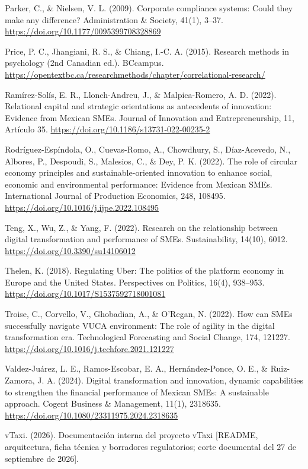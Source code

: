 {Parker, C., \& Nielsen, V. L. (2009). Corporate compliance systems: Could they make any difference? Administration \& Society, 41(1), 3–37. \url{https://doi.org/10.1177/0095399708328869}


Price, P. C., Jhangiani, R. S., \& Chiang, I.-C. A. (2015). Research methods in psychology (2nd Canadian ed.). BCcampus. \url{https://opentextbc.ca/researchmethods/chapter/correlational-research/}


Ramírez-Solís, E. R., Llonch-Andreu, J., \& Malpica-Romero, A. D. (2022). Relational capital and strategic orientations as antecedents of innovation: Evidence from Mexican SMEs. Journal of Innovation and Entrepreneurship, 11, Artículo 35. \url{https://doi.org/10.1186/s13731-022-00235-2}


Rodríguez-Espíndola, O., Cuevas-Romo, A., Chowdhury, S., Díaz-Acevedo, N., Albores, P., Despoudi, S., Malesios, C., \& Dey, P. K. (2022). The role of circular economy principles and sustainable-oriented innovation to enhance social, economic and environmental performance: Evidence from Mexican SMEs. International Journal of Production Economics, 248, 108495. \url{https://doi.org/10.1016/j.ijpe.2022.108495}


Teng, X., Wu, Z., \& Yang, F. (2022). Research on the relationship between digital transformation and performance of SMEs. Sustainability, 14(10), 6012. \url{https://doi.org/10.3390/su14106012}


Thelen, K. (2018). Regulating Uber: The politics of the platform economy in Europe and the United States. Perspectives on Politics, 16(4), 938–953. \url{https://doi.org/10.1017/S1537592718001081}


Troise, C., Corvello, V., Ghobadian, A., \& O'Regan, N. (2022). How can SMEs successfully navigate VUCA environment: The role of agility in the digital transformation era. Technological Forecasting and Social Change, 174, 121227. \url{https://doi.org/10.1016/j.techfore.2021.121227}


Valdez-Juárez, L. E., Ramos-Escobar, E. A., Hernández-Ponce, O. E., \& Ruiz-Zamora, J. A. (2024). Digital transformation and innovation, dynamic capabilities to strengthen the financial performance of Mexican SMEs: A sustainable approach. Cogent Business \& Management, 11(1), 2318635. \url{https://doi.org/10.1080/23311975.2024.2318635}


vTaxi. (2026). Documentación interna del proyecto vTaxi [README, arquitectura, ficha técnica y borradores regulatorios; corte documental del 27 de septiembre de 2026].


}
